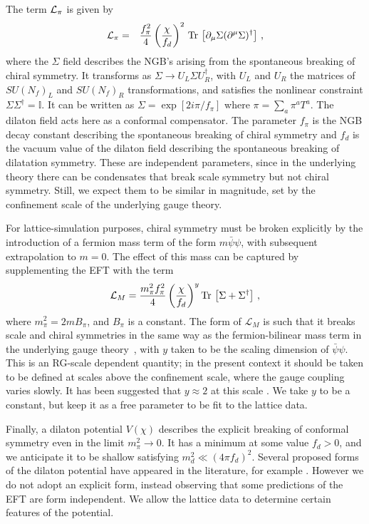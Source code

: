 \documentclass[a4paper,11pt]{article}
\newcommand{\beqs}{\begin{eqnarray}}
\newcommand{\eeqs}{\end{eqnarray}}
\newcommand{\Tr}{{\rm Tr}}
\def\Tr{{\rm Tr \,}}                                    %
\begin{document}
The term ${\cal L}_{\pi}$ is given by 
\beqs 
{\cal L}_{\pi}&=&\frac{f_{\pi}^2}{4}\left(\frac{\chi}{f_{d}}\right)^2 \,\Tr\left[\partial_\mu \Sigma (\partial^{\mu} \Sigma)^{\dagger}\right]\,,
\label{Eq:Lpi} 
\eeqs 
where the $\Sigma$ field describes the NGB's arising from the spontaneous breaking of chiral symmetry. It transforms as $\Sigma\rightarrow U_L \Sigma U_R^{\dagger}$, with $U_L$ and $U_R$ the matrices of $SU(N_f)_L$ and $SU(N_f)_R$ transformations, and satisfies the nonlinear constraint $\Sigma \Sigma^\dagger = \mathbb{I}$. It can be written as $\Sigma=\exp\left[2i \pi/f_{\pi} \right]$ where $\pi=\sum_a\pi^a T^a$. The dilaton field acts here as a conformal compensator. The parameter $f_{\pi}$ is the NGB decay constant describing the spontaneous breaking of chiral symmetry and $f_d$ is the vacuum value of the dilaton field describing the spontaneous breaking of dilatation symmetry. These are independent parameters, since in the underlying theory there can be condensates that break scale symmetry but not chiral symmetry. Still, we expect them to be similar in magnitude, set by the confinement scale of the underlying gauge theory.

For lattice-simulation purposes, chiral symmetry must be broken explicitly by the introduction of a fermion mass term of the form $m\bar{\psi}\psi$, with subsequent extrapolation to $m=0$. The effect of this mass can be captured by supplementing the EFT with the term
\begin{align}
\mathcal{L}_M= \frac{m^2_\pi f^2_\pi}{4}\left(\frac{\chi}{f_d}\right)^y \Tr \left[\Sigma + \Sigma^\dagger\right]\,,
\label{Eq:LM}
\end{align}
where $m_{\pi}^2 = 2 m B_{\pi}$, and $B_{\pi}$ is a constant.
The form of $\mathcal{L}_M$ is such that it breaks scale and chiral symmetries in the same way as the fermion-bilinear mass term in the underlying gauge theory~\cite{LLB}, with $y$ taken to be the scaling dimension of $\bar{\psi}\psi$. This is an RG-scale dependent quantity; in the present context it should be taken to be defined at scales above the confinement scale, where the gauge coupling varies slowly. It has been suggested that $y\approx 2$ at this scale \cite{CandG,Shrock}. We take $y$ to be a constant, but keep it as a free parameter to be fit to the lattice data.


Finally, a dilaton potential $V(\chi)$ describes the explicit breaking of conformal symmetry even in the limit $m_{\pi}^2 \rightarrow 0$. It has a minimum at some value $f_d > 0$, and we anticipate it to be shallow satisfying $m_d^2 \ll (4 \pi f_{d})^2$. Several proposed forms of the dilaton potential have appeared in the literature, for example \cite{EFTDilaton1,GGS}. However we do not adopt an explicit form, instead observing that some predictions of the EFT are form independent. We allow the lattice data to determine certain features of the potential.
\end{document}
